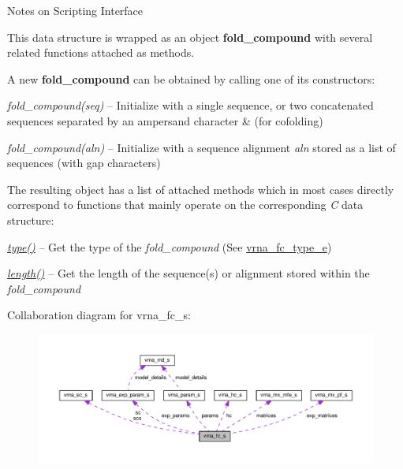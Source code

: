 \begin{DoxyRefDesc}{Notes on Scripting Interface}
\item[\hyperlink{scripting__scripting000001}{Notes on Scripting Interface}]

This data structure is wrapped as an object {\bfseries fold\+\_\+compound} with several related functions attached as methods.

A new {\bfseries fold\+\_\+compound} can be obtained by calling one of its constructors\+:~\newline

\begin{DoxyItemize}
\item {\itshape fold\+\_\+compound(seq)} -- Initialize with a single sequence, or two concatenated sequences separated by an ampersand character \textquotesingle{}\&\textquotesingle{} (for cofolding)
\item {\itshape fold\+\_\+compound(aln)} -- Initialize with a sequence alignment {\itshape aln} stored as a list of sequences (with gap characters)
\end{DoxyItemize}The resulting object has a list of attached methods which in most cases directly correspond to functions that mainly operate on the corresponding {\itshape C} data structure\+:~\newline

\begin{DoxyItemize}
\item {\itshape \hyperlink{group__fold__compound_ac5eab693deac9a1a40c2a95ac294707c}{type()}} -- Get the type of the {\itshape fold\+\_\+compound} (See \hyperlink{group__fold__compound_ga01a4ff86fa71deaaa5d1abbd95a1447d}{vrna\+\_\+fc\+\_\+type\+\_\+e})
\item {\itshape \hyperlink{group__fold__compound_a95fbfed770b858e50c766505dc4bf998}{length()}} -- Get the length of the sequence(s) or alignment stored within the {\itshape fold\+\_\+compound} 
\end{DoxyItemize}\end{DoxyRefDesc}


Collaboration diagram for vrna\+\_\+fc\+\_\+s\+:
\nopagebreak
\begin{figure}[H]
\begin{center}
\leavevmode
\includegraphics[width=350pt]{structvrna__fc__s__coll__graph}
\end{center}
\end{figure}

